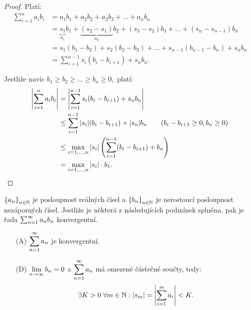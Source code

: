 \begin{proof}
    Platí:
    \begin{align*}
        \sum_{i=1}^n a_ib_i 
        &= a_1b_1 + a_2b_2 + a_3b_3 + \dots + a_nb_n \\
        &= \underbrace{s_1}_{a_1}b_1 +
            \underbrace{(s_2-s_1)}_{a_2}b_2 + 
            (s_3-s_2)b_3 + \dots + (s_n - s_{n-1})b_n \\
        &= s_1(b_1-b_2) + s_2(b_2-b_3) + \dots + s_{n-1}(b_{n-1} -b_n) + s_nb_n \\
        &= \sum_{i=1}^{n-1} s_i(b_i-b_{i+1}) + s_nb_n.
    \end{align*}

    Jestliže navíc $b_1 \geq b_2 \geq \dots \geq b_n \geq 0,$ platí:
    \begin{align*}
        \left|\sum_{i=1}^n a_ib_i \right|
        &= \left|\sum_{i=1}^{n-1} s_i(b_i - b_{i+1}) + s_nb_n\right| \\
        &\leq \sum_{i=1}^{n-1}|s_i|(b_i-b_{i+1}) + |s_n|b_n \tag{$b_i - b_{i+1} \geq 0, b_n \geq 0$} \\
        &\leq \max_{i=1,\dots,n} |s_i| \left(\sum_{i=1}^{n-1}(b_i - b_{i+1}) + b_n\right) \\
        &= \max_{i=1,\dots,n}|s_i| \cdot b_1.
    \end{align*}
\end{proof}

\begin{theorem}
    \label{th:abel_dirichletovo_kriterium}
    \Necht $\left\{a_n\right\}_{n\in\mathbb{N}}$ je posloupnost reálných čísel a $\left\{b_n\right\}_{n\in\mathbb{N}}$
    je nerostoucí posloupnost nezáporných čísel. Jestliže je některá z následujících
    podmínek splněna, pak je řada $\sum_{n=1}^\infty a_nb_n$ konvergentní.
    \begin{itemize}
        \item[(A)] $\displaystyle \sum_{n=1}^\infty a_n$ je konvergentní.
        \item[(D)] $\displaystyle \lim_{n \to \infty} b_n = 0$ a $\displaystyle \sum_{n=1}^\infty a_n$ má omezené částečné
            součty, tedy:
            $$\exists K > 0 \; \forall m \in \mathbb{N}: |s_m| = \left|\sum_{i=1}^m a_i\right|
            < K.$$
    \end{itemize}
\end{theorem}

